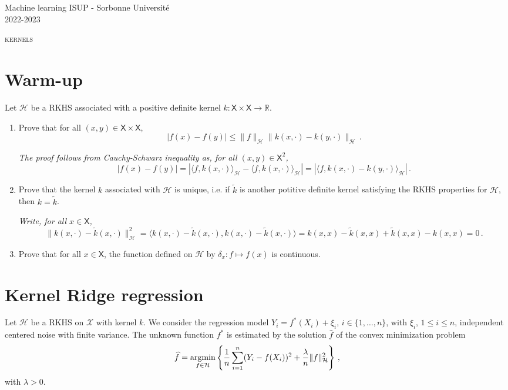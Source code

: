 \documentclass[a4paper,10pt,fleqn]{article}
\newcommand{\eqsp}{\,}
\newcommand{\rset}{\ensuremath{\mathbb{R}}}
\newcommand{\calH}{\ensuremath{\mathcal{H}}}
\newcommand{\xset}{\ensuremath{\mathsf{X}}}
\newcommand{\1}{\ensuremath{\mathbbm{1}}}
\newcommand{\argmin}{\mathop{\textrm{argmin}}}
\begin{document}
\noindent Machine learning \hfill ISUP - Sorbonne Universit\'e \\
 2022-2023

\noindent\hrulefill

\begin{center}
\textsc{kernels}
\end{center}
\hrulefill

\medskip



\section*{Warm-up}
 Let $\calH$ be a RKHS associated with a positive definite kernel $k: \xset\times \xset \to \rset$.
\begin{enumerate}
\item  Prove that for all $(x,y)\in\xset\times \xset$, 
$$
|f(x)-f(y)|\leqslant \|f\|_{\calH}\|k(x,\cdot)-k(y,\cdot)\|_{\calH}\eqsp.
$$

\vspace{.2cm}

{\em
The proof follows from Cauchy-Schwarz inequality as, for all $(x,y)\in\xset^2$,
$$
|f(x)-f(y)|= |\langle f, k(x,\cdot)\rangle_{\mathcal{H}}-\langle f, k(x,\cdot)\rangle_{\mathcal{H}}| = |\langle f, k(x,\cdot)-k(y,\cdot)\rangle_{\mathcal{H}}|\eqsp.
$$
}

\item  Prove that the kernel $k$ associated with $\calH$ is unique, i.e. if $\widetilde k$ is another potitive definite kernel satisfying the RKHS properties for $\calH$, then $k = \widetilde k$.

\vspace{.2cm}

{\em
Write, for all $x\in\xset$,
$$
\|k(x,\cdot) - \widetilde k(x,\cdot)\|_{\calH}^2 = \langle k(x,\cdot) - \widetilde k(x,\cdot),k(x,\cdot) - \widetilde k(x,\cdot)\rangle = k(x,x) - \widetilde k(x,x) +  \widetilde k(x,x) - k(x,x)= 0\,.
$$
}

\item  Prove that  for all $x\in\xset$, the function defined on $\calH$ by $\delta_x: f \mapsto f(x)$ is continuous.

\vspace{.2cm}

{\em

}
\end{enumerate}

\section*{Kernel Ridge regression}
Let $\mathcal{H}$ be a RKHS on $\mathcal{X}$ with kernel $k$.  We consider the regression model $Y_{i}=f^*(X_{i})+\xi_{i}$, $i\in\{1,\ldots,n\}$, with $\xi_{i}$, $1\leq i \leq n$,  independent centered noise with finite variance. The unknown function $f^*$ is estimated  by the solution 
$\widehat f$  of the convex minimization problem
$$\widehat f=\argmin_{f\in\mathcal{H}}\left\{{1\over n}\sum_{i=1}^n(Y_{i}-f(X_{i}))^2+{\lambda\over n} \|f\|_{\mathcal{H}}^2\right\}\,,$$
with $\lambda>0$.
\end{document}
